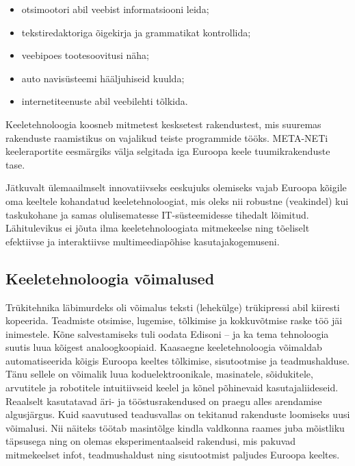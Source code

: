 \begin{multicols}{2}
\begin{itemize}
\item otsimootori abil veebist informatsiooni leida;
\item tekstiredaktoriga õigekirja ja grammatikat kontrollida;
\item veebipoes tootesoovitusi näha;
\item auto navisüsteemi hääljuhiseid kuulda;
\item internetiteenuste abil veebilehti tõl\-kida.
\end{itemize}

Keeletehnoloogia koosneb mitmetest kesk\-setest raken\-dustest, mis suuremas raken\-duste raamistikus on vajalikud teiste prog\-rammide tööks. META-NETi keele\-raportite eesmärgiks välja selgitada iga Euroopa keele tuumikrakenduste tase.



Jätkuvalt ülemaailmselt innovatiivseks eeskujuks olemiseks vajab Euroopa kõigile oma keeltele kohandatud keeletehno\-loogiat, mis oleks nii robustne (veakindel) kui taskukohane ja samas olulisematesse IT-süsteemidesse tihedalt lõimitud.  Lähi\-tulevikus ei jõuta ilma keeletehno\-loogiata mitmekeelse ning tõeliselt efektiivse ja interaktiivse multimeediapõhise kasutaja\-kogemuseni.

\subsection{Keeletehnoloogia võimalused}

Trükitehnika läbimurdeks oli võimalus teksti (lehekülge) trükipressi abil kiiresti kopeerida.  Teadmiste otsimise, lugemise, tõlkimise ja kokkuvõtmise raske töö jäi inimestele.  Kõne salvestamiseks tuli oodata Edisoni -- ja ka tema tehnoloogia suutis luua kõigest analoog\-koopiaid.  Kaasaegne keeletehnoloogia võimaldab automatiseerida kõigis Euroopa keeltes tõlkimise, sisutootmise ja teadmushalduse.  Tänu sellele on võimalik luua koduelektroonikale, masinatele, sõidukitele, arvutitele ja robotitele intui\-tiivseid keelel ja kõnel põhinevaid kasutajaliideseid.  Reaalselt kasutatavad äri- ja tööstusrakendused on praegu alles arendamise algusjärgus.  Kuid saavutused teadusvallas on tekitanud rakenduste loo\-miseks uusi võimalusi.  Nii näiteks töötab masintõlge kindla valdkonna raames juba mõistliku täpsusega ning on olemas eksperi\-mentaalseid rakendusi, mis pakuvad mitmekeelset infot, teadmushaldust ning sisutootmist paljudes Euroopa keeltes.


\end{multicols}
